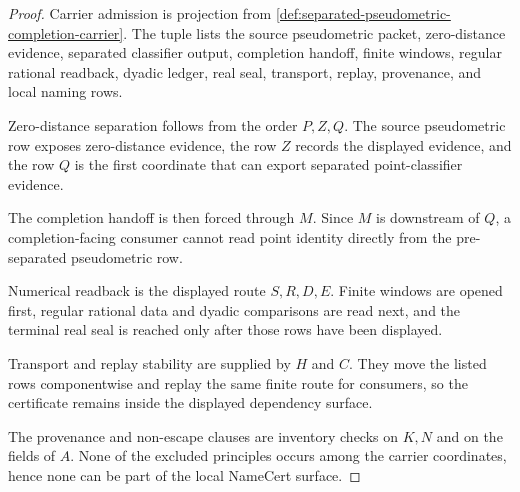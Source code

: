 \begin{proof}
Carrier admission is projection from \autoref{def:separated-pseudometric-completion-carrier}. The tuple lists the source pseudometric packet, zero-distance evidence, separated classifier output, completion handoff, finite windows, regular rational readback, dyadic ledger, real seal, transport, replay, provenance, and local naming rows.

Zero-distance separation follows from the order $P,Z,Q$. The source pseudometric row exposes zero-distance evidence, the row $Z$ records the displayed evidence, and the row $Q$ is the first coordinate that can export separated point-classifier evidence.

The completion handoff is then forced through $M$. Since $M$ is downstream of $Q$, a completion-facing consumer cannot read point identity directly from the pre-separated pseudometric row.

Numerical readback is the displayed route $S,R,D,E$. Finite windows are opened first, regular rational data and dyadic comparisons are read next, and the terminal real seal is reached only after those rows have been displayed.

Transport and replay stability are supplied by $H$ and $C$. They move the listed rows componentwise and replay the same finite route for consumers, so the certificate remains inside the displayed dependency surface.

The provenance and non-escape clauses are inventory checks on $K,N$ and on the fields of $A$. None of the excluded principles occurs among the carrier coordinates, hence none can be part of the local NameCert surface.
\end{proof}

